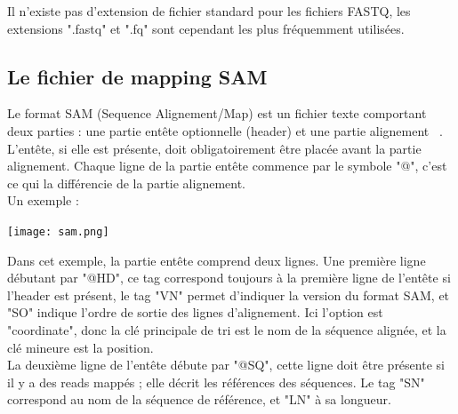 \documentclass[a4paper,12pt]{article}
\begin{document}
Il n'existe pas d'extension de fichier standard pour les fichiers FASTQ, les extensions ".fastq" et ".fq" sont cependant les plus fréquemment utilisées. 

\subsection{Le fichier de mapping SAM}

Le format SAM (Sequence Alignement/Map) est un fichier texte comportant deux parties : une partie entête optionnelle (header) et une partie alignement ~\cite{SAM}.\\

L'entête, si elle est présente, doit obligatoirement être placée avant la partie alignement. Chaque ligne de la partie entête commence par le symbole "@", c'est ce qui la différencie de la partie alignement. \\
\clearpage
Un exemple : 
\begin{center}
 \texttt{[image: sam.png]}~
\end{center}
Dans cet exemple, la partie entête comprend deux lignes. Une première ligne débutant par "@HD", ce tag correspond toujours à la première ligne de l'entête si l'header est présent, le tag "VN" permet d'indiquer la version du format SAM, et "SO" indique l'ordre de sortie des lignes d'alignement. Ici l'option est "coordinate", donc la clé principale de tri est le nom de la séquence alignée, et la clé mineure est la position. \\
La deuxième ligne de l'entête débute par "@SQ", cette ligne doit être présente si il y a des reads mappés ; elle décrit les références des séquences. Le tag "SN" correspond au nom de la séquence de référence, et "LN" à sa longueur. \\
\end{document}
